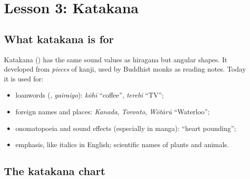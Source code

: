 \chapter{Lesson 3: Katakana}

\section{What katakana is for}

Katakana () has the same sound values as hiragana but angular shapes. It
developed from \emph{pieces} of kanji, used by Buddhist monks as reading notes. Today it
is used for:
\begin{itemize}
  \item loanwords (, \emph{gairaigo}):  \emph{kōhī}
        ``coffee'',  \emph{terebi} ``TV'';
  \item foreign names and places:  \emph{Kanada},  \emph{Toronto},
         \emph{Wōtārū} ``Waterloo'';
  \item onomatopoeia and sound effects (especially in manga): 
        ``heart pounding'';
  \item emphasis, like italics in English; scientific names of plants and animals.
\end{itemize}

\section{The katakana chart}

